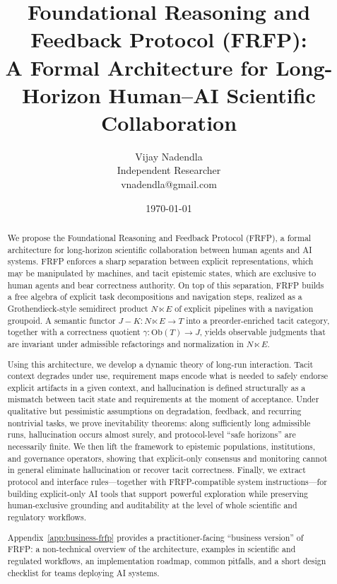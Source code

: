 \documentclass[11pt]{article}
\title{Foundational Reasoning and Feedback Protocol (FRFP):\\
A Formal Architecture for Long-Horizon Human--AI Scientific Collaboration}
\author{Vijay Nadendla\\[0.3ex]
Independent Researcher\\
vnadendla@gmail.com}
\date{\today}
\theoremstyle{definition}
\begin{document}
\maketitle


\begin{abstract}
We propose the Foundational Reasoning and Feedback Protocol (FRFP), a formal architecture for long-horizon scientific collaboration between human agents and AI systems. FRFP enforces a sharp separation between explicit representations, which may be manipulated by machines, and tacit epistemic states, which are exclusive to human agents and bear correctness authority. On top of this separation, FRFP builds a free algebra of explicit task decompositions and navigation steps, realized as a Grothendieck-style semidirect product \(N \ltimes E\) of explicit pipelines with a navigation groupoid. A semantic functor \(J{-}K : N \ltimes E \to T\) into a preorder-enriched tacit category, together with a correctness quotient \(\gamma : \mathrm{Ob}(T) \to J\), yields observable judgments that are invariant under admissible refactorings and normalization in \(N \ltimes E\).

Using this architecture, we develop a dynamic theory of long-run interaction. Tacit context degrades under use, requirement maps encode what is needed to safely endorse explicit artifacts in a given context, and hallucination is defined structurally as a mismatch between tacit state and requirements at the moment of acceptance. Under qualitative but pessimistic assumptions on degradation, feedback, and recurring nontrivial tasks, we prove inevitability theorems: along sufficiently long admissible runs, hallucination occurs almost surely, and protocol-level ``safe horizons'' are necessarily finite. We then lift the framework to epistemic populations, institutions, and governance operators, showing that explicit-only consensus and monitoring cannot in general eliminate hallucination or recover tacit correctness. Finally, we extract protocol and interface rules---together with FRFP-compatible system instructions---for building explicit-only AI tools that support powerful exploration while preserving human-exclusive grounding and auditability at the level of whole scientific and regulatory workflows.

Appendix~\ref{app:business-frfp}  provides a practitioner-facing ``business version'' of FRFP: a non-technical overview of the architecture, examples in scientific and regulated workflows, an implementation roadmap, common pitfalls, and a short design checklist for teams deploying AI systems.

\end{abstract}
\end{document}
